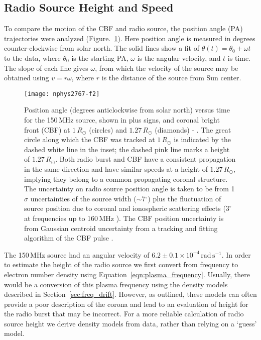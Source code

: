 \subsection{Radio Source Height and Speed}
To compare the motion of the CBF and radio source, the position angle (PA) trajectories were analyzed (Figure.~\ref{fig:angle_time}). Here position angle is measured in degrees counter-clockwise from solar north. The solid lines show a fit of $\theta(t) = \theta_0 + \omega t$ to the data, where $\theta_0$ is the starting PA, $\omega$ is the angular velocity, and $t$ is time. The slope of each line gives $\omega$, from which the velocity of the source may be obtained using $v=r\omega$, where $r$ is the distance of the source from Sun center. 
\begin{figure}[!t]
	\begin{center}
		\texttt{[image: nphys2767-f2]}
		\caption[Radio source and CBF position angle versus time]{Position angle (degrees anticlockwise from solar north) versus time for the 150\,MHz source, shown in plus signs, and coronal bright front (CBF) at $1\,R_{\odot}$ (circles) and $1.27\,R_{\odot}$ (diamonds) - \citep{carley2013}. The great circle along which the CBF was tracked at $1\,R_{\odot}$ is indicated by the dashed white line in the inset; the dashed pink line marks a height of $1.27\,R_{\odot}$. Both radio burst and CBF have a consistent propagation in the same direction and have similar speeds at a height of $1.27\,R_{\odot}$, implying they belong to a common propagating coronal structure. The uncertainty on radio source position angle is taken to be from 1$\sigma$ uncertainties of the source width ($\sim$7$^{\circ}$) plus the fluctuation of source position due to coronal and ionospheric scattering effects ($3^{\circ}$ at frequencies up to 160\,MHz \citep{stewart1982}). The CBF position uncertainty is from Gaussian centroid uncertainty from a tracking and fitting algorithm of the CBF pulse \citep{long2011a}.}
		\label{fig:angle_time}
	\end{center}
\end{figure}

The 150\,MHz source had an angular velocity of $6.2\pm0.1\times10^{-4}\,\mathrm{rad\,s^{-1}} $. In order to estimate the height of the radio source we first convert from frequency to electron number density using Equation~\ref{eqn:plasma_frequency}. Usually, there would be a conversion of this plasma frequency using the density models described in Section~\ref{sec:freq_drift}. However, as outlined, these models can often provide a poor description of the corona and lead to an evaluation of height for the radio burst that may be incorrect. For a more reliable calculation of radio source height we derive density models from data, rather than relying on a `guess' model.

